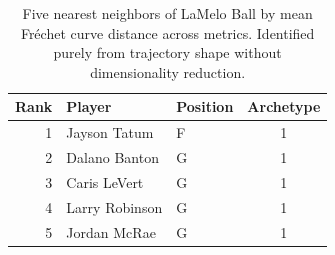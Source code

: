 \begin{table}[htbp]
  \centering\small
  \begin{tabular}{rllc}
    \toprule
    Rank & Player & Position & Archetype \\
    \midrule
    1 & Jayson Tatum & F & 1 \\
    2 & Dalano Banton & G & 1 \\
    3 & Caris LeVert & G & 1 \\
    4 & Larry Robinson & G & 1 \\
    5 & Jordan McRae & G & 1 \\
    \bottomrule
  \end{tabular}
  \caption{Five nearest neighbors of LaMelo Ball by mean Fr\'{e}chet curve distance across metrics. Identified purely from trajectory shape without dimensionality reduction.}
  \label{tab:LaMelo_Ball_frechet_curve_neighbors}
\end{table}

